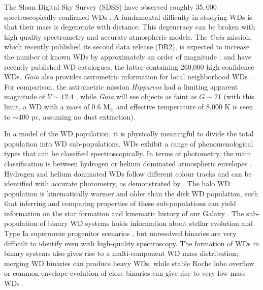 \documentclass[fleqn,usenatbib]{mnras}
\begin{document}
The Sloan Digital Sky Survey (SDSS) have observed roughly $35,000$ spectroscopically confirmed WDs \citep{2013ApJS..204....5K,2015MNRAS.446.4078K,2016MNRAS.455.3413K}. A fundamental difficulty in studying WDs is that their mass is degenerate with distance. This degeneracy can be broken with high quality spectrometry and accurate atmospheric models. The \emph{Gaia} mission, which recently published its second data release (DR2), is expected to increase the number of known WDs by approximately an order of magnitude \citep{Jordan:2006jg,2014A&A...565A..11C}; \cite{2018arXiv180702559J} and \cite{2018arXiv180703315G} have recently published WD catalogues, the latter containing 260,000 high-confidence WDs. \emph{Gaia} also provides astrometric information for local neighborhood WDs \citep{2018MNRAS.479L.113K,2018MNRAS.480.3942H}. For comparison, the astrometric mission \emph{Hipparcos} had a limiting apparent magnitude of $V \sim 12.4$ \citep{1997A&A...323L..49P}, while \emph{Gaia} will see objects as faint as $G \sim 21$ (with this limit, a WD with a mass of 0.6 M$_\odot$ and effective temperature of 8,000 K is seen to ${\sim}400$ pc, assuming no dust extinction).

In a model of the WD population, it is physically meaningful to divide the total population into WD sub-populations. WDs exhibit a range of phenomenological types that can be classified spectroscopically. In terms of photometry, the main classification is between hydrogen or helium dominated atmospheric envelopes \citep{Tremblay:2007hq,2011ApJ...737...28B,2015A&A...583A..86K}. Hydrogen and helium dominated WDs follow different colour tracks and can be identified with accurate photometry, as demonstrated by \cite{Harris:2005gd,2006AJ....131..582K,Mortlock:2008gf}. The halo WD population is kinematically warmer and older than the disk WD population, such that inferring and comparing properties of these sub-populations can yield information on the star formation and kinematic history of our Galaxy \citep{1998ApJ...503..239I,2016MNRAS.463.2453D}. The sub-population of binary WD systems holds information about stellar evolution \citep{Postnov:2014tza,2017A&A...602A..16T,2018MNRAS.479L.113K} and Type Ia supernovae progenitor scenarios \citep{Livio:2018rue}, but unresolved binaries are very difficult to identify even with high-quality spectroscopy. The formation of WDs in binary systems also gives rise to a multi-component WD mass distribution; merging WD binaries can produce heavy WDs, while stable Roche lobe overflow or common envelope evolution of close binaries can give rise to very low mass WDs \citep{2013ApJS..204....5K,2013A&A...557A..19A,2016A&A...595A..35I,2018arXiv181207226L}.
\end{document}
